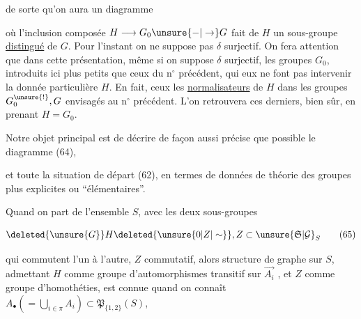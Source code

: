de sorte qu'on aura  un diagramme



où l'inclusion composée $H\longrightarrow G_0\unsure{-|\to}G$ fait de $H$ un sous-groupe \uline{distingué} de $G$. Pour l'instant on ne suppose pas $\delta$ surjectif. On fera attention que dans cette présentation, même si on suppose $\delta$ surjectif, les groupes $G_0$,  introduits ici   plus petits que ceux du n$^\circ$ précédent, qui eux ne font pas intervenir la donnée particulière  $H$. En fait, ceux   les \uline{normalisateurs} de $H$ dans les groupes $G_0^{\unsure{!}},G$ envisagés au n$^\circ$ précédent. L'on retrouvera  ces derniers, bien sûr, en prenant $H=G_0$.

Notre objet principal est de décrire de façon aussi précise que possible le diagramme (64),

et toute la situation de départ (62), en termes de  données de théorie des groupes plus explicites ou \textquotedblleft{}élémentaires\textquotedblright.

Quand on part de l'ensemble $S$, avec les deux sous-groupes

\[
\deleted{\unsure{G}}H\deleted{\unsure{0|Z|\sim}},Z\subset\unsure{\mathfrak S|\mathcal G}_S
\tag*{(65)}
\]

qui commutent l'un à l'autre, $Z$ commutatif, alors   structure de graphe  sur $S$, admettant $H$ comme groupe d'automorphismes transitif  sur  $\overrightarrow{A_i}$ , et $Z$ comme groupe d'homothéties, est connue quand on connaît  $A_{\bullet}(=\bigcup_{i\in\pi}A_i)\subset\mathfrak P_{\{1,2\}}(S)$,

